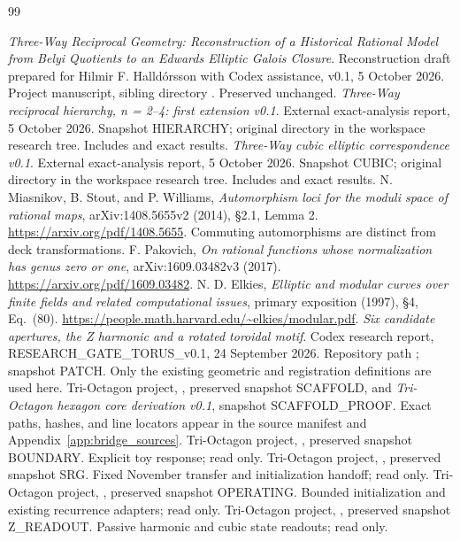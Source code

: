 \begin{thebibliography}{99}
\raggedright
{} \emph{Three-Way Reciprocal Geometry: Reconstruction of a Historical Rational Model from Belyi Quotients to an Edwards Elliptic Galois Closure}. Reconstruction draft prepared for Hilmir F. Halldórsson with Codex assistance, v0.1, 5 October 2026. Project manuscript, sibling directory . Preserved unchanged.
 \emph{Three-Way reciprocal hierarchy, n = 2--4: first extension v0.1}. External exact-analysis report, 5 October 2026. Snapshot HIERARCHY; original directory  in the workspace research tree. Includes  and exact results.
 \emph{Three-Way cubic elliptic correspondence v0.1}. External exact-analysis report, 5 October 2026. Snapshot CUBIC; original directory  in the workspace research tree. Includes  and exact results.
 N. Miasnikov, B. Stout, and P. Williams, \emph{Automorphism loci for the moduli space of rational maps}, arXiv:1408.5655v2 (2014), §2.1, Lemma 2. \url{https://arxiv.org/pdf/1408.5655}. Commuting automorphisms are distinct from deck transformations.
 F. Pakovich, \emph{On rational functions whose normalization has genus zero or one}, arXiv:1609.03482v3 (2017). \url{https://arxiv.org/pdf/1609.03482}.
 N. D. Elkies, \emph{Elliptic and modular curves over finite fields and related computational issues}, primary exposition (1997), §4, Eq.~(80). \url{https://people.math.harvard.edu/~elkies/modular.pdf}.
 \emph{Six candidate apertures, the Z harmonic and a rotated toroidal motif}. Codex research report, RESEARCH\_GATE\_TORUS\_v0.1, 24 September 2026. Repository path ; snapshot PATCH. Only the existing geometric and registration definitions are used here.
 Tri-Octagon project, , preserved snapshot SCAFFOLD, and \emph{Tri-Octagon hexagon core derivation v0.1}, snapshot SCAFFOLD\_PROOF. Exact paths, hashes, and line locators appear in the source manifest and Appendix~\ref{app:bridge_sources}.
 Tri-Octagon project, , preserved snapshot BOUNDARY. Explicit  toy response; read only.
 Tri-Octagon project, , preserved snapshot SRG. Fixed November transfer and initialization handoff; read only.
 Tri-Octagon project, , preserved snapshot OPERATING. Bounded initialization and existing recurrence adapters; read only.
 Tri-Octagon project, , preserved snapshot Z\_READOUT. Passive harmonic and cubic state readouts; read only.
\end{thebibliography}
